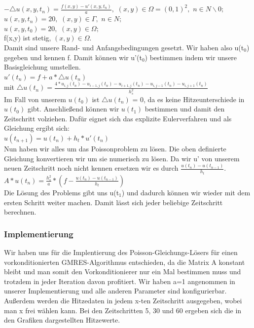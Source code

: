 \documentclass{article}
\begin{document}
$- \triangle u(x,y,t_{n}) = \frac{f(x,y)-u'(x,y,t_{n})}{a}   ,$   $  (x,y) \in \Omega = (0,1)^2  ,$   $  n \in N\backslash0;$\\
$u(x,y,t_{n}) = 20,$   $(x,y) \in \Gamma ,$   $ n \in N;$\\
$u(x,y,t_{0}) = 20,$   $ (x,y) \in \Omega ; $ \\
f(x,y) ist stetig,   $ (x,y) \in \Omega .$ \\
Damit sind unsere Rand- und Anfangsbedingungen gesetzt. Wir haben also u(t$_{0}$) gegeben und kennen f. Damit können wir u'(t$_{0}$) bestimmen indem wir unsere Basisgleichung umstellen.\\
$u'(t_{n})  = f + a * \triangle u(t_{n})$\\
mit $\triangle u(t_{n}) = \frac{4*u_{i,j}(t_{n})-u_{i-1,j}(t_{n})-u_{i+1,j}(t_{n})-u_{i,j-1}(t_{n})-u_{i,j+1}(t_{n})}{h_{s}^{2}}$\\
Im Fall von unserem $u(t_{0})$ ist $\triangle u(t_{n})$ = 0, da es keine Hitzeunterschiede in $u(t_{0})$ gibt. Anschließend können wir $u(t_{1})$ bestimmen und damit den Zeitschritt volziehen. Dafür eignet sich das explizite Eulerverfahren und als Gleichung ergibt sich:\\
$u(t_{n+1})  =u(t_{n}) + h_{t} * u'(t_{n})$\\
Nun haben wir alles um das Poissonproblem zu lösen. Die oben definierte Gleichung konvertieren wir um sie numerisch zu lösen. Da wir u' von unserem neuen Zeitschritt noch nicht kennen ersetzen wir es durch $\frac{ u(t_{n}) -  u(t_{n-1})}{h_{t}}$.\\
$A* u(t_{n}) = \frac{h_{s}^{2}}{a} * ( f-\frac{ u(t_{n}) -  u(t_{n-1})}{h_{t}}) $\\
Die Lösung des Problems gibt uns u(t$_{1}$) und dadurch können wir wieder mit dem ersten Schritt weiter machen. Damit lässt sich jeder beliebige Zeitschritt berechnen.
\subsubsection{Implementierung}
Wir haben uns für die Implentierung des Poisson-Gleichungs-Lösers für einen vorkonditionierten GMRES-Algorithmus entschieden, da die Matrix A konstant bleibt und man somit den Vorkonditionierer nur ein Mal bestimmen muss und trotzdem in jeder Iteration davon profitiert. Wir haben a=1 angenommen in unserer Implementierung und alle anderen Parameter sind konfigurierbar. Außerdem werden die Hitzedaten in jedem x-ten Zeitschritt ausgegeben, wobei man x frei wählen kann. Bei den Zeitschritten 5, 30 und 60 ergeben sich die in den Grafiken dargestellten Hitzewerte. \\
\end{document}
